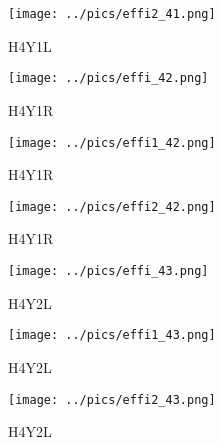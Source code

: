 \documentclass[10pt, xcolor={dvipsnames}, aspectratio = 169]{beamer}
\begin{document}
\begin{frame}

\begin{figure}
\centering
\texttt{[image: ../pics/effi2\_41.png]}
\caption{H4Y1L}
\end{figure}

\end{frame}

\begin{frame}

\begin{figure}
\centering
\texttt{[image: ../pics/effi\_42.png]}
\caption{H4Y1R}
\end{figure}

\end{frame}

\begin{frame}

\begin{figure}
\centering
\texttt{[image: ../pics/effi1\_42.png]}
\caption{H4Y1R}
\end{figure}

\end{frame}

\begin{frame}

\begin{figure}
\centering
\texttt{[image: ../pics/effi2\_42.png]}
\caption{H4Y1R}
\end{figure}

\end{frame}

\begin{frame}

\begin{figure}
\centering
\texttt{[image: ../pics/effi\_43.png]}
\caption{H4Y2L}
\end{figure}

\end{frame}

\begin{frame}

\begin{figure}
\centering
\texttt{[image: ../pics/effi1\_43.png]}
\caption{H4Y2L}
\end{figure}

\end{frame}

\begin{frame}

\begin{figure}
\centering
\texttt{[image: ../pics/effi2\_43.png]}
\caption{H4Y2L}
\end{figure}

\end{frame}
\end{document}
